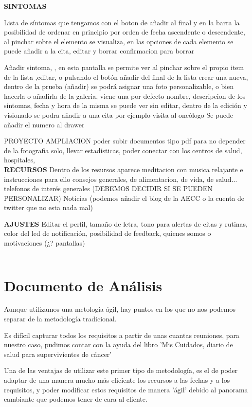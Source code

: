 \documentclass[../pfc.tex]{subfiles}
\begin{document}
	
	\textbf{SINTOMAS}
	
	Lista de síntomas que tengamos con el boton de añadir al final y en la barra la posibilidad de ordenar en principio por orden de fecha ascendente o descendente,
	al pinchar sobre el elemento se visualiza, 
	en las opciones de cada elemento se puede añadir a la cita, editar y borrar confirmacion para borrar
	
	Añadir sintoma, , en esta pantalla se permite ver al pinchar sobre el propio item de la lista ,editar, o pulsando el botón añadir del final de la lista crear una nueva, 
	dentro de la prueba (añadir) se podrá asignar una foto personalizable, o bien hacerla o añadirla de la galeria, viene una por defecto
	nombre, descripcion de los sintomas,
	fecha y hora de la misma
	se puede ver sin editar, dentro de la edición y visionado se podra añadir a una cita por ejemplo visita al oncólogo
	Se puede añadir el numero al drawer
	
	PROYECTO AMPLIACION poder subir documentos tipo pdf para no depender de la fotografia solo, llevar estadísticas, poder conectar con los centros de salud, hospitales, \\
	
	
	\textbf{RECURSOS}
	Dentro de los resursos aparece meditacion con musica relajante e instrucciones para ello
	consejos generales, de alimentacion, de vida, de salud...
	telefonos de interés generales (DEBEMOS DECIDIR SI SE PUEDEN PERSONALIZAR)
	Noticias (podemos añadir el blog de la AECC o la cuenta de twitter que no esta nada mal)
	
	
	\textbf{AJUSTES}
	Editar el perfil, 
	tamaño de letra, 	
	tono para alertas de citas y rutinas, 
	color del led de notificación, 
	posibilidad de feedback,
	quienes somos o motivaciones (¿? pantallas)\\\\

	
	\section{Documento de Análisis}
	
	Aunque utilizamos una metología ágil, hay puntos en los que no nos podemos separar de la metodología tradicional.
			
	Es difícil capturar todos los requisitos a partir de unas cuantas reuniones, para nuestro caso, pudimos contar con la ayuda del libro 'Mis Cuidados, diario de salud para supervivientes de cáncer'
			
	Una de las ventajas de utilizar este primer tipo de metodología, es el de poder adaptar de una manera mucho más eficiente los recursos a las fechas y a los requisitos, y poder modificar estos requisitos de manera 'ágil' debido al panorama cambiante que podemos tener de cara al cliente.
			
\end{document}
